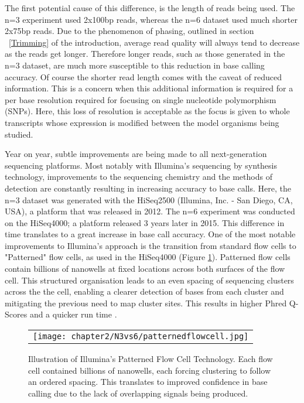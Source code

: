 The first potential cause of this difference, is the length of reads being used. The n=3 experiment used 2x100bp reads, whereas the n=6 dataset used much shorter 2x75bp reads. Due to the phenomenon of phasing, outlined in section ~\ref{Trimming} of the introduction, average read quality will always tend to decrease as the reads get longer. Therefore longer reads, such as those generated in the n=3 dataset, are much more susceptible to this reduction in base calling accuracy. Of course the shorter read length comes with the caveat of reduced information. This is a concern when this additional information is required for a per base resolution required for focusing on single nucleotide polymorphism (SNPs). Here, this loss of resolution is acceptable as the focus is given to whole transcripts whose expression is modified between the model organisms being studied. 

Year on year, subtle improvements are being made to all next-generation sequencing platforms. Most notably with Illumina's sequencing by synthesis technology, improvements to the sequencing chemistry and the methods of detection are constantly resulting in increasing accuracy to base calls. Here, the n=3 dataset was generated with the HiSeq2500 (Illumina, Inc. - San Diego, CA, USA), a platform that was released in 2012. The n=6 experiment was conducted on the HiSeq4000; a platform released 3 years later in 2015. This difference in time translates to a great increase in base call accuracy. One of the most notable improvements to Illumina's approach is the transition from standard flow cells to "Patterned" flow cells, as used in the HiSeq4000 (Figure \ref{fig:patterned}). Patterned flow cells contain billions of nanowells at fixed locations across both surfaces of the flow cell. This structured organisation leads to an even spacing of sequencing clusters across the the cell, enabling a clearer detection of bases from each cluster and mitigating the previous need to map cluster sites. This results in higher Phred Q-Scores and a quicker run time \cite{patterned}.

\begin{figure}[!htbp]
  \centering 
  \begin{tabular}{c}
  \texttt{[image: chapter2/N3vs6/patternedflowcell.jpg]} \\
\end{tabular} 
  \caption[Illustration of Illumina's Patterned Flow Cell Technology]{Illustration of Illumina's Patterned Flow Cell Technology. Each flow cell contained billions of nanowells, each forcing clustering to follow an ordered spacing. This translates to improved confidence in base calling due to the lack of overlapping signals being produced.}
  \label{fig:patterned}
\end{figure}


